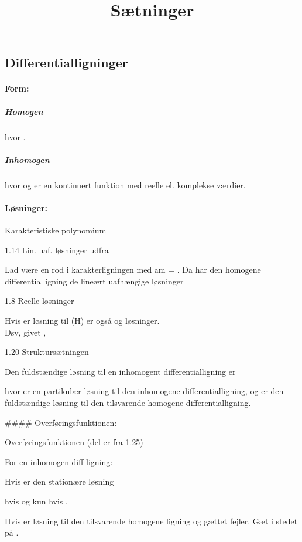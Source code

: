 \documentclass[
]{article}
\title{Sætninger}
\author{}
\date{}
\begin{document}
\maketitle

\subsection{Differentialligninger}\label{differentialligninger}

\paragraph{Form:}\label{form}

\subparagraph{Homogen}\label{homogen}

hvor {}.

\subparagraph{Inhomogen}\label{inhomogen}

hvor {} og {} er en kontinuert funktion med reelle el. komplekse
værdier.

\paragraph{Løsninger:}\label{luxf8sninger}

Karakteristiske polynomium

1.14 Lin. uaf. løsninger udfra {}

Lad {} være en rod i karakterligningen med am = {}. Da har den homogene
differentialligning de lineært uafhængige løsninger

1.8 Reelle løsninger

Hvis {} er løsning til (H) er også {} og {} løsninger.\\
Dsv, givet {}, {}

1.20 Struktursætningen

Den fuldstændige løsning til en inhomogent differentialligning er

hvor {} er en partikulær løsning til den inhomogene differentialligning,
og {} er den fuldstændige løsning til den tilsvarende homogene
differentialligning.

\#\#\#\# Overføringsfunktionen:

Overføringsfunktionen (del er fra 1.25)

For en inhomogen diff ligning:

Hvis {} er den stationære løsning

hvis og kun hvis {}.

Hvis {} er {} løsning til den tilsvarende homogene ligning og gættet
fejler. Gæt i stedet på {}.
\end{document}
